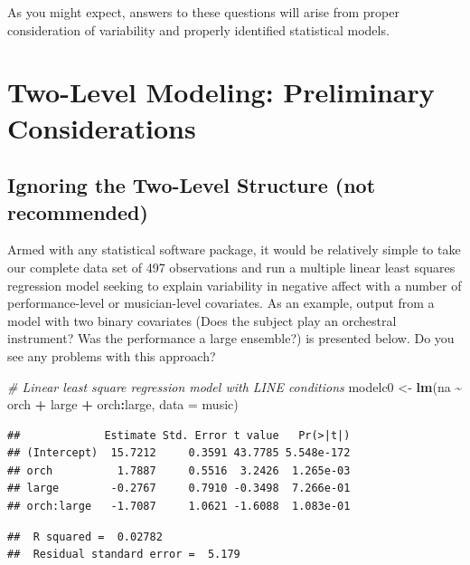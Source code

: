 \documentclass[
]{krantz}
\newenvironment{Shaded}{\begin{snugshade}}{\end{snugshade}}
\newcommand{\AttributeTok}[1]{\textcolor[rgb]{0.27,0.27,0.27}{#1}}
\newcommand{\CommentTok}[1]{\textcolor[rgb]{0.37,0.37,0.37}{\textit{#1}}}
\newcommand{\FunctionTok}[1]{\textcolor[rgb]{0.27,0.27,0.27}{\textbf{#1}}}
\newcommand{\NormalTok}[1]{#1}
\newcommand{\OtherTok}[1]{\textcolor[rgb]{0.37,0.37,0.37}{#1}}
\newcommand{\SpecialCharTok}[1]{\textcolor[rgb]{0.43,0.43,0.43}{\textbf{#1}}}
\begin{document}
As you might expect, answers to these questions will arise from proper consideration of variability and properly identified statistical models.

\section{Two-Level Modeling: Preliminary Considerations}\label{twolevelmodeling}

\subsection{Ignoring the Two-Level Structure (not recommended)}\label{multregr}

Armed with any statistical software package, it would be relatively simple to take our complete data set of 497 observations and run a multiple linear least squares regression model seeking to explain variability in negative affect with a number of performance-level or musician-level covariates. As an example, output from a model with two binary covariates (Does the subject play an orchestral instrument? Was the performance a large ensemble?) is presented below. Do you see any problems with this approach?

\begin{Shaded}
\begin{Highlighting}[]
\CommentTok{\# Linear least square regression model with LINE conditions}
\NormalTok{modelc0 }\OtherTok{\textless{}{-}} \FunctionTok{lm}\NormalTok{(na }\SpecialCharTok{\textasciitilde{}}\NormalTok{ orch }\SpecialCharTok{+}\NormalTok{ large }\SpecialCharTok{+}\NormalTok{ orch}\SpecialCharTok{:}\NormalTok{large, }\AttributeTok{data =}\NormalTok{ music)}
\end{Highlighting}
\end{Shaded}

\begin{verbatim}
##             Estimate Std. Error t value   Pr(>|t|)
## (Intercept)  15.7212     0.3591 43.7785 5.548e-172
## orch          1.7887     0.5516  3.2426  1.265e-03
## large        -0.2767     0.7910 -0.3498  7.266e-01
## orch:large   -1.7087     1.0621 -1.6088  1.083e-01
\end{verbatim}

\begin{verbatim}
##  R squared =  0.02782 
##  Residual standard error =  5.179
\end{verbatim}
\end{document}
